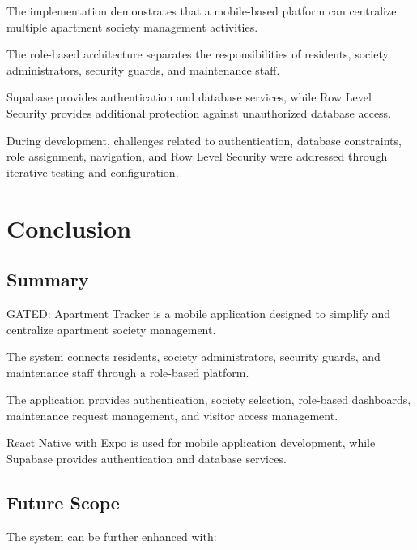 \documentclass{tietreport}
\begin{document}
The implementation demonstrates that a mobile-based
platform can centralize multiple apartment society
management activities.

The role-based architecture separates the
responsibilities of residents, society administrators,
security guards, and maintenance staff.

Supabase provides authentication and database services,
while Row Level Security provides additional protection
against unauthorized database access.

During development, challenges related to authentication,
database constraints, role assignment, navigation, and
Row Level Security were addressed through iterative
testing and configuration.


\chapter{Conclusion}

\section{Summary}

GATED: Apartment Tracker is a mobile application designed
to simplify and centralize apartment society management.

The system connects residents, society administrators,
security guards, and maintenance staff through a
role-based platform.

The application provides authentication, society
selection, role-based dashboards, maintenance request
management, and visitor access management.

React Native with Expo is used for mobile application
development, while Supabase provides authentication and
database services.

\section{Future Scope}

The system can be further enhanced with:
\end{document}
